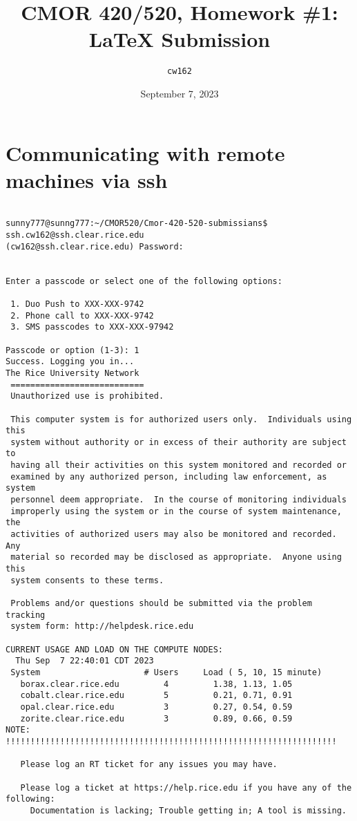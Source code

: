 \documentclass{article}
\title{CMOR 420/520, Homework \#1: LaTeX Submission}
\author{\texttt{cw162}}
\date{September 7, 2023}
\begin{document}
\maketitle

\section{Communicating with remote machines via ssh}

\begin{verbatim}

sunny777@sunng777:~/CMOR520/Cmor-420-520-submissians$ ssh.cw162@ssh.clear.rice.edu
(cw162@ssh.clear.rice.edu) Password:


Enter a passcode or select one of the following options:

 1. Duo Push to XXX-XXX-9742
 2. Phone call to XXX-XXX-9742
 3. SMS passcodes to XXX-XXX-97942

Passcode or option (1-3): 1
Success. Logging you in...
The Rice University Network
 ===========================
 Unauthorized use is prohibited.
 
 This computer system is for authorized users only.  Individuals using this
 system without authority or in excess of their authority are subject to
 having all their activities on this system monitored and recorded or
 examined by any authorized person, including law enforcement, as system
 personnel deem appropriate.  In the course of monitoring individuals
 improperly using the system or in the course of system maintenance, the
 activities of authorized users may also be monitored and recorded.  Any
 material so recorded may be disclosed as appropriate.  Anyone using this
 system consents to these terms.
 
 Problems and/or questions should be submitted via the problem tracking
 system form: http://helpdesk.rice.edu
 
CURRENT USAGE AND LOAD ON THE COMPUTE NODES:
  Thu Sep  7 22:40:01 CDT 2023
 System                   	# Users   	Load ( 5, 10, 15 minute)      
   borax.clear.rice.edu   	    4     	  1.38, 1.13, 1.05            
   cobalt.clear.rice.edu  	    5     	  0.21, 0.71, 0.91            
   opal.clear.rice.edu    	    3     	  0.27, 0.54, 0.59            
   zorite.clear.rice.edu  	    3     	  0.89, 0.66, 0.59            
NOTE: !!!!!!!!!!!!!!!!!!!!!!!!!!!!!!!!!!!!!!!!!!!!!!!!!!!!!!!!!!!!!!!!!!!
 
   Please log an RT ticket for any issues you may have.
 
   Please log a ticket at https://help.rice.edu if you have any of the following:
     Documentation is lacking; Trouble getting in; A tool is missing.
 

\end{verbatim}
\end{document}
